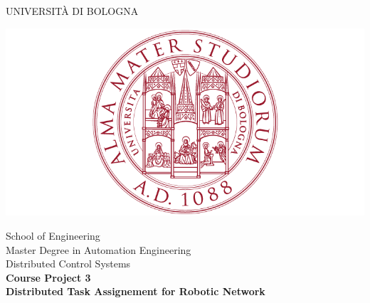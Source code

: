 \documentclass{article}
\begin{document}
\thispagestyle{empty}                                                 
\begin{center}                                                            
    \vspace{5mm}
    {\LARGE UNIVERSIT\`A DI BOLOGNA} \\                       
      \vspace{5mm}
\end{center}

\begin{center}
  \includegraphics[scale=.27]{images/logo_unibo.png}
\end{center}

\begin{center}
      \vspace{5mm}
      {\LARGE School of Engineering} \\
        \vspace{3mm}
      {\Large Master Degree in Automation Engineering} \\
      \vspace{20mm}
      {\LARGE Distributed Control Systems} \\
      \vspace{5mm}
      {\Large\textbf{Course Project 3}}\\
      {\Large\textbf{Distributed Task Assignement for Robotic Network}}
      \vspace{15mm}
\end{center}
\end{document}
